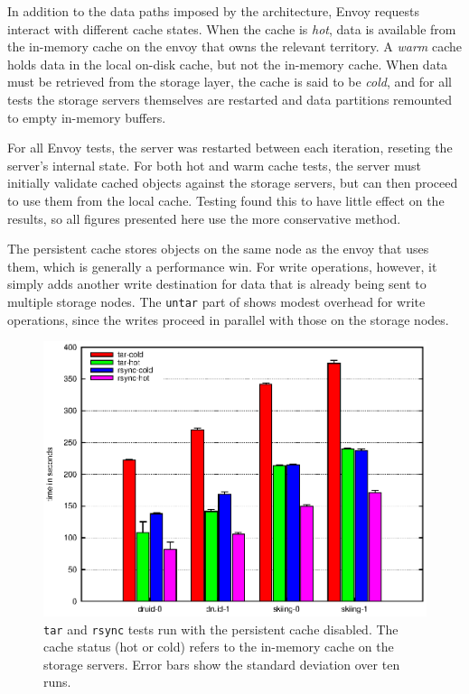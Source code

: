 In addition to the data paths imposed by the architecture, Envoy requests interact with different cache states. When the cache is \emph{hot}, data is available from the in-memory cache on the envoy that owns the relevant territory. A \emph{warm} cache holds data in the local on-disk cache, but not the in-memory cache. When data must be retrieved from the storage layer, the cache is said to be \emph{cold}, and for all tests the storage servers themselves are restarted and data partitions remounted to empty in-memory buffers.

For all Envoy tests, the server was restarted between each iteration, reseting the server's internal state. For both hot and warm cache tests, the server must initially validate cached objects against the storage servers, but can then proceed to use them from the local cache. Testing found this to have little effect on the results, so all figures presented here use the more conservative method.

The persistent cache stores objects on the same node as the envoy that uses them, which is generally a performance win. For write operations, however, it simply adds another write destination for data that is already being sent to multiple storage nodes. The \texttt{untar} part of  shows modest overhead for write operations, since the writes proceed in parallel with those on the storage nodes.

\begin{figure}[t]
\centering
\includegraphics[width=\figwidth]{figures/envoy-nocache}
\caption[Cold and hot storage servers with no persistent cache]{\texttt{tar} and \texttt{rsync} tests run with the persistent cache disabled. The cache status (hot or cold) refers to the in-memory cache on the storage servers. Error bars show the standard deviation over ten runs.}
\label{fig:envoy-nocache}
\end{figure}

